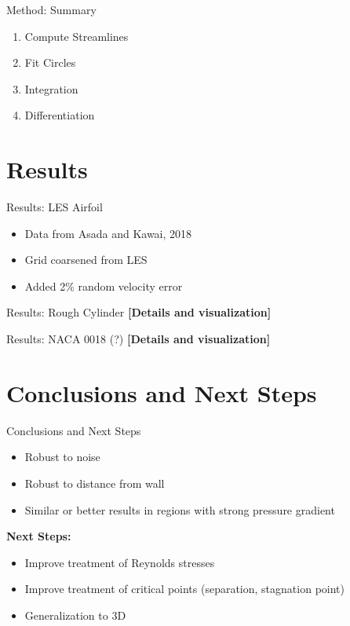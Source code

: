 \documentclass{beamer}
\begin{document}
\begin{frame}{Method: Summary}
    \begin{enumerate}
        \item Compute Streamlines
        \item Fit Circles
        \item Integration
        \item Differentiation
    \end{enumerate}
\end{frame}

\section{Results}
\begin{frame}{Results: LES Airfoil}
    \begin{itemize}
        \item Data from Asada and Kawai, 2018
        \item Grid coarsened from LES
        \item Added 2\% random velocity error
    \end{itemize}
\end{frame}

\begin{frame}{Results: Rough Cylinder}
    \textbf{[Details and visualization]}
\end{frame}

\begin{frame}{Results: NACA 0018 (?)}
    \textbf{[Details and visualization]}
\end{frame}

\section{Conclusions and Next Steps}
\begin{frame}{Conclusions and Next Steps}
    \begin{itemize}
        \item Robust to noise
        \item Robust to distance from wall
        \item Similar or better results in regions with strong pressure gradient
    \end{itemize}
    \textbf{Next Steps:}
    \begin{itemize}
        \item Improve treatment of Reynolds stresses
        \item Improve treatment of critical points (separation, stagnation point)
        \item Generalization to 3D
    \end{itemize}
\end{frame}
\end{document}

